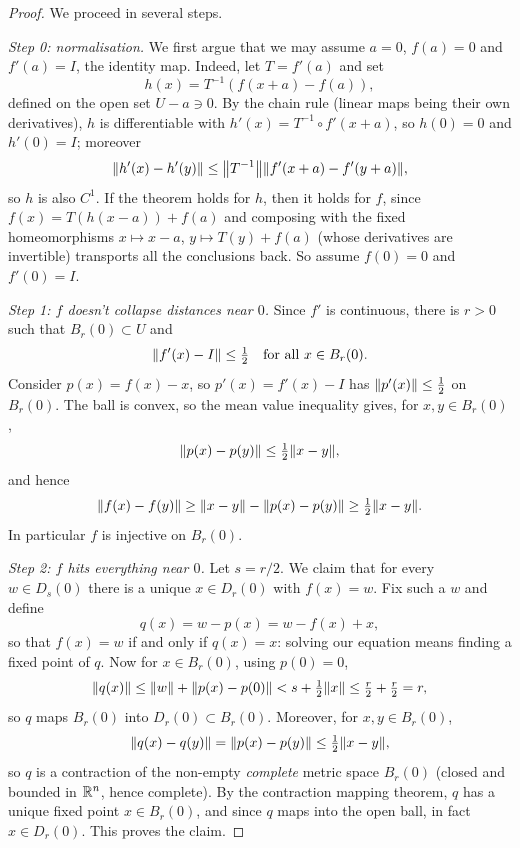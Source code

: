 \documentclass[a4paper]{scrartcl}
\begin{document}
\begin{proof}
    We proceed in several steps.

    \emph{Step 0: normalisation.} We first argue that we may assume $a = 0$, $f(a) = 0$ and $f'(a) = I$, the identity map. Indeed, let $T = f'(a)$ and set
    $$
    h(x) = T^{-1}\left(f(x + a) - f(a)\right),
    $$
    defined on the open set $U - a \ni 0$. By the chain rule (linear maps being their own derivatives), $h$ is differentiable with $h'(x) = T^{-1} \circ f'(x + a)$, so $h(0) = 0$ and $h'(0) = I$; moreover
    $$
    \norm{h'(x) - h'(y)} \leq \norm{T^{-1}}\norm{f'(x + a) - f'(y + a)},
    $$
    so $h$ is also $C^1$. If the theorem holds for $h$, then it holds for $f$, since $f(x) = T(h(x - a)) + f(a)$ and composing with the fixed homeomorphisms $x \mapsto x - a$, $y \mapsto T(y) + f(a)$ (whose derivatives are invertible) transports all the conclusions back. So assume $f(0) = 0$ and $f'(0) = I$.

    \emph{Step 1: $f$ doesn't collapse distances near $0$.} Since $f'$ is continuous, there is $r > 0$ such that $B_r(0) \subset U$ and
    $$
    \norm{f'(x) - I} \leq \tfrac{1}{2} \quad \text{for all } x \in B_r(0).
    $$
    Consider $p(x) = f(x) - x$, so $p'(x) = f'(x) - I$ has $\norm{p'(x)} \leq \frac{1}{2}$ on $B_r(0)$. The ball is convex, so the mean value inequality gives, for $x, y \in B_r(0)$,
    $$
    \norm{p(x) - p(y)} \leq \tfrac{1}{2}\norm{x - y},
    $$
    and hence
    $$
    \norm{f(x) - f(y)} \geq \norm{x - y} - \norm{p(x) - p(y)} \geq \tfrac{1}{2}\norm{x - y}.
    $$
    In particular $f$ is injective on $B_r(0)$.

    \emph{Step 2: $f$ hits everything near $0$.} Let $s = r/2$. We claim that for every $w \in D_s(0)$ there is a unique $x \in D_r(0)$ with $f(x) = w$. Fix such a $w$ and define
    $$
    q(x) = w - p(x) = w - f(x) + x,
    $$
    so that $f(x) = w$ if and only if $q(x) = x$: solving our equation means finding a fixed point of $q$. Now for $x \in B_r(0)$, using $p(0) = 0$,
    $$
    \norm{q(x)} \leq \norm{w} + \norm{p(x) - p(0)} < s + \tfrac{1}{2}\norm{x} \leq \tfrac{r}{2} + \tfrac{r}{2} = r,
    $$
    so $q$ maps $B_r(0)$ into $D_r(0) \subset B_r(0)$. Moreover, for $x, y \in B_r(0)$,
    $$
    \norm{q(x) - q(y)} = \norm{p(x) - p(y)} \leq \tfrac{1}{2}\norm{x - y},
    $$
    so $q$ is a contraction of the non-empty \emph{complete} metric space $B_r(0)$ (closed and bounded in $\mathbb{R}^n$, hence complete). By the contraction mapping theorem, $q$ has a unique fixed point $x \in B_r(0)$, and since $q$ maps into the open ball, in fact $x \in D_r(0)$. This proves the claim.


\end{proof}
\end{document}
